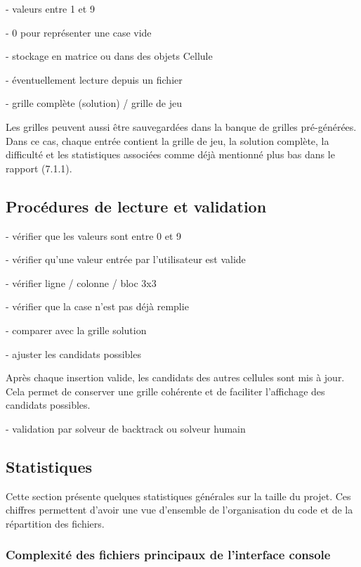 \documentclass[a4paper]{article}
\begin{document}
- valeurs entre 1 et 9

- 0 pour représenter une case vide

- stockage en matrice ou dans des objets Cellule

- éventuellement lecture depuis un fichier

- grille complète (solution) / grille de jeu 

Les grilles peuvent aussi être sauvegardées dans la banque de grilles pré-générées. 
Dans ce cas, chaque entrée contient la grille de jeu, la solution complète, la difficulté et les statistiques associées comme déjà mentionné plus bas dans le rapport (7.1.1).

\subsection{Procédures de lecture et validation}
- vérifier que les valeurs sont entre 0 et 9

- vérifier qu’une valeur entrée par l’utilisateur est valide

- vérifier ligne / colonne / bloc 3x3

- vérifier que la case n’est pas déjà remplie

- comparer avec la grille solution

- ajuster les candidats possibles

Après chaque insertion valide, les candidats des autres cellules sont mis à jour. Cela permet de conserver une grille cohérente et de faciliter l'affichage des candidats possibles.

- validation par solveur de backtrack ou solveur humain


\subsection{Statistiques}

Cette section présente quelques statistiques générales sur la taille du projet. Ces chiffres permettent d'avoir une vue d'ensemble de l'organisation du code et de la répartition des fichiers.

\subsubsection{Complexité des fichiers principaux de l'interface console}
\end{document}
